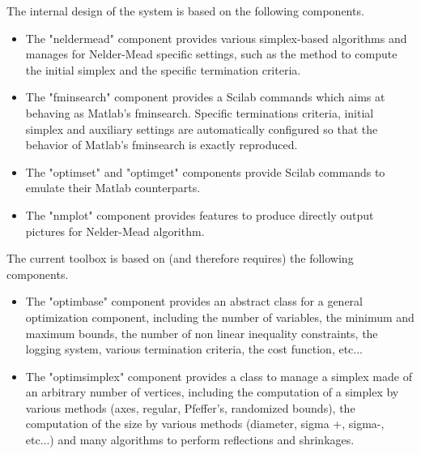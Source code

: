 The internal design of the system is based on the following components.
\begin{itemize}
\item The "neldermead" component provides various simplex-based 
algorithms and manages for Nelder-Mead specific settings, such as the 
method to compute the initial simplex and the specific termination 
criteria.
\item The "fminsearch" component provides a Scilab commands which aims 
at behaving as Matlab's fminsearch. Specific terminations criteria, 
initial simplex and auxiliary settings are automatically configured so 
that the behavior of Matlab's fminsearch is exactly reproduced.
\item The "optimset" and "optimget" components provide Scilab commands 
to emulate their Matlab counterparts.
\item The "nmplot" component provides features to 
produce directly output pictures for Nelder-Mead algorithm.
\end{itemize}
The current toolbox is based on (and therefore requires) the following components.
\begin{itemize}
\item The "optimbase" component provides an abstract class for a general optimization 
component, including the number of variables, the minimum and maximum 
bounds, the number of non linear inequality constraints, the logging 
system, various termination criteria, the cost function, etc...
\item The "optimsimplex" component provides a class to manage a simplex made of an 
arbitrary number of vertices, including the computation of a simplex by 
various methods (axes, regular, Pfeffer's, randomized bounds), the 
computation of the size by various methods (diameter, sigma +, sigma-, 
etc...) and many algorithms to perform reflections and shrinkages.
\end{itemize}

